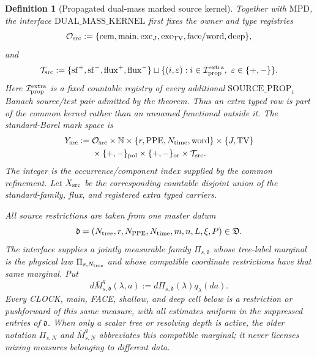 \documentclass[11pt]{article}
\newtheorem{definition}[theorem]{Definition}
\begin{document}
\begin{definition}[Propagated dual-mass marked source kernel]
\label{def:source-incidence-space}
Together with $\mathrm{MPD}$, the interface
$\mathrm{DUAL\_MASS\_KERNEL}$ first fixes the owner and type registries
\[
 \mathcal O_{\rm src}:=
 \{{\rm cem},{\rm main},{\rm exc}_J,{\rm exc}_{\rm TV},
   {\rm face/word},{\rm deep}\},
\]
and
\[
 \mathcal T_{\rm src}:=
 \{{\rm sf}^{+},{\rm sf}^{-},{\rm flux}^{+},{\rm flux}^{-}\}
 \sqcup\{(i,\varepsilon):i\in\mathcal I_{\rm prop}^{\rm extra},
                    \ \varepsilon\in\{+,-\}\}.
\]
Here $\mathcal I_{\rm prop}^{\rm extra}$ is a fixed countable registry of
every additional $\mathrm{SOURCE\_PROP}_i$ Banach source/test pair admitted
by the theorem.  Thus an extra typed row is part of the common kernel rather
than an unnamed functional outside it.  The standard-Borel mark space is
\[
 \begin{aligned}
 Y_{\rm src}:={}&\mathcal O_{\rm src}\times\mathbb N\times
 \{r,\mathrm{PPE},N_{\rm time},\mathrm{word}\}\times
 \{J,\mathrm{TV}\}\\
 &\times\{+,-\}_{\rm pol}\times\{+,-\}_{\rm or}\times
 \mathcal T_{\rm src}.
 \end{aligned}
\]
The integer is the occurrence/component index supplied by the common
refinement.  Let $X_{\rm src}$ be the corresponding countable disjoint union
of the standard-family, flux, and registered extra typed carriers.

All source restrictions are taken from one master datum
\[
 \mathfrak d=(N_{\rm tree},r,N_{\rm PPE},N_{\rm time},m,n,L,\xi,P)
 \in\mathfrak D.
\]
The interface supplies a jointly measurable family
$\Pi_{s,\mathfrak d}$ whose tree-label marginal is the physical law
$\Pi_{s,N_{\rm tree}}$ and whose compatible coordinate restrictions have
that same marginal.  Put
\[
 d\overline M_{s,\mathfrak d}^{q}(\lambda,a)
 :=d\Pi_{s,\mathfrak d}(\lambda)q_\lambda(da).
\]
Every CLOCK, main, FACE, shallow, and deep cell below is a restriction or
pushforward of this same measure, with all estimates uniform in the
suppressed entries of $\mathfrak d$.  When only a scalar tree or resolving
depth is active, the older notation $\Pi_{s,N}$ and
$\overline M_{s,N}^{q}$ abbreviates this compatible marginal; it never
licenses mixing measures belonging to different data.


\end{definition}
\end{document}
